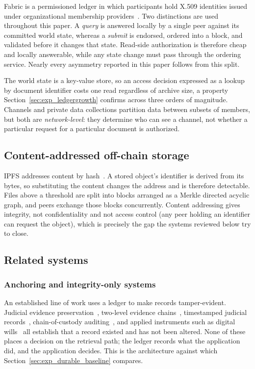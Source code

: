 \documentclass[preprint,12pt]{elsarticle}
\begin{document}
Fabric is a permissioned ledger in which participants hold X.509 identities
issued under organizational membership providers~\cite{androulaki2018hyperledger}.
Two distinctions are used throughout this paper. A \emph{query} is answered
locally by a single peer against its committed world state, whereas a
\emph{submit} is endorsed, ordered into a block, and validated before it
changes that state. Read-side authorization is therefore cheap and locally
answerable, while any state change must pass through the ordering service.
Nearly every asymmetry reported in this paper follows from this split.

The world state is a key-value store, so an access decision expressed as a
lookup by document identifier costs one read regardless of archive size, a property
Section~\ref{sec:exp_ledgergrowth} confirms across three orders of
magnitude. Channels and private data collections partition data between subsets
of members, but both are \emph{network-level}: they determine who can see a
channel, not whether a particular request for a particular document is
authorized.

\subsection{Content-addressed off-chain storage}
\label{sec:ipfs}

IPFS addresses content by hash~\cite{benet2014ipfs}. A stored object's
identifier is derived from its bytes, so substituting the content changes the
address and is therefore detectable. Files above a threshold are split into blocks
arranged as a Merkle directed acyclic graph, and peers exchange those blocks
concurrently. Content addressing gives integrity, not confidentiality and not access control (any peer holding an identifier can request the
object), which is precisely the gap the systems reviewed below try to close.

\subsection{Related systems}
\label{sec:related_systems}

\subsubsection{Anchoring and integrity-only systems}
An established line of work uses a ledger to make records tamper-evident.
Judicial evidence preservation~\cite{liu2024blockchain}, two-level evidence
chains~\cite{twoLevelBlockchain}, timestamped judicial
records~\cite{verma2021nyaya}, chain-of-custody
auditing~\cite{hanafi2021ipfschain}, and applied instruments such as digital
wills~\cite{hernando2025wills} all establish that a record existed and has not
been altered. None of these places a decision on the retrieval path; the ledger records
what the application did, and the application decides. This is the architecture
against which Section~\ref{sec:exp_durable_baseline} compares.
\end{document}
